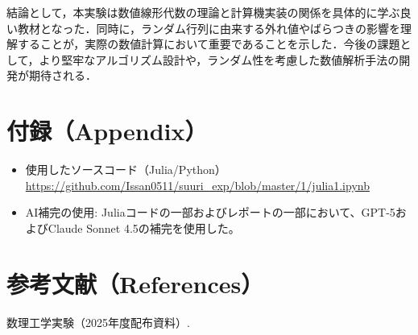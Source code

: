 \documentclass[a4paper,11pt]{ltjsarticle}
\begin{document}
結論として，本実験は数値線形代数の理論と計算機実装の関係を具体的に学ぶ良い教材となった．同時に，ランダム行列に由来する外れ値やばらつきの影響を理解することが，実際の数値計算において重要であることを示した．今後の課題として，より堅牢なアルゴリズム設計や，ランダム性を考慮した数値解析手法の開発が期待される．
\section*{付録（Appendix）}
\begin{itemize}
  \item 使用したソースコード（Julia/Python）
  \url{https://github.com/Issan0511/suuri_exp/blob/master/1/julia1.ipynb}
  \item AI補完の使用: Juliaコードの一部およびレポートの一部において、GPT-5およびClaude Sonnet 4.5の補完を使用した。
\end{itemize}

\section*{参考文献（References）}
\begin{thebibliography}{99}
 数理工学実験（2025年度配布資料）.
\end{thebibliography}
\end{document}
